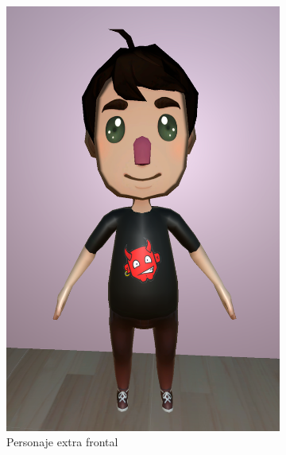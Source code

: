 \documentclass[12pt, a4paper,twoside,titlepage]{book}
\begin{document}
 \begin{figure}
\centering
\begin{subfigure}{.5\textwidth}
  \centering
  \includegraphics[width=.95\linewidth]{TGF/Artes/EVIL_front.png}
  \caption{Personaje extra frontal}
\end{subfigure}%
\begin{subfigure}{.5\textwidth}
  \centering

\end{subfigure}
\end{figure}
\end{document}
